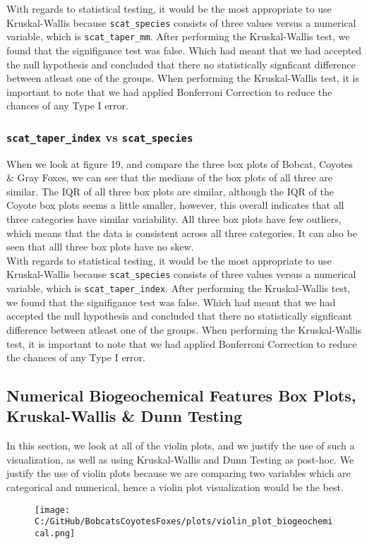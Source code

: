 \documentclass[a4paper]{article}
\begin{document}
\noindent With regards to statistical testing, it would be the most appropriate to use Kruskal-Wallis because \texttt{scat\_species} consists of three values
versus a numerical variable, which is \texttt{scat\_taper\_mm}. After performing the Kruskal-Wallis test, we found that the signifigance test was false.
Which had meant that we had accepted the null hypothesis and concluded that there no statistically signficant difference between atleast one of the groups.
When performing the Kruskal-Wallis test, it is important to note that we had applied Bonferroni Correction to reduce the chances of any Type I error. 

\subsubsection{\texttt{scat\_taper\_index} vs \texttt{scat\_species}}
When we look at figure 19, and compare the three box plots of Bobcat, Coyotes \& Gray Foxes, we can see that the medians of the box plots of all three are
similar. The IQR of all three box plots are similar, although the IQR of the Coyote box plots seems a little  smaller, however, this overall indicates that
all three categories have similar variability. All three box plots have few outliers, which means that the data is consistent across all three categories.
It can also be seen that alll three box plots have no skew. \\

\noindent With regards to statistical testing, it would be the most appropriate to use Kruskal-Wallis because \texttt{scat\_species} consists of three values
versus a numerical variable, which is \texttt{scat\_taper\_index}.  After performing the Kruskal-Wallis test, we found that the signifigance test was false.
Which had meant that we had accepted the null hypothesis and concluded that there no statistically signficant difference between atleast one of the groups.
When performing the Kruskal-Wallis test, it is important to note that we had applied Bonferroni Correction to reduce the chances of any Type I error. \\

\newpage

\subsection{Numerical Biogeochemical Features Box Plots, Kruskal-Wallis \& Dunn Testing}
In this section, we look at all of the violin plots, and we justify the use of such a visualization, as well as using Kruskal-Wallis and Dunn Testing as 
post-hoc. We justify the use of violin plots because we are comparing two variables which are categorical and numerical, hence a violin plot visualization 
would be the best.
\vspace{0.5cm}
\begin{figure}[h]
    \centering
    \texttt{[image: C:/GitHub/BobcatsCoyotesFoxes/plots/violin\_plot\_biogeochemical.png]} 
\end{figure}
\end{document}
